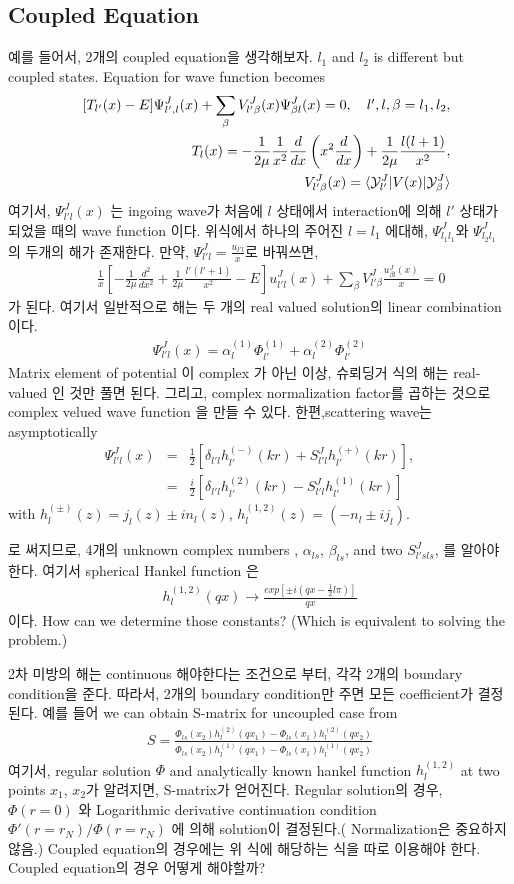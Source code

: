 \documentclass[10pt]{article}
\newcommand{\bea}{\begin{eqnarray}}
\newcommand{\eea}{\end{eqnarray}}
\newcommand{\no}{\nonumber \\}
\def\la{\langle}
\def\ra{\rangle}
\begin{document}
\subsection{Coupled Equation}
예를 들어서, 2개의 coupled equation을 생각해보자.
$l_1$ and $l_2$ is different but coupled states.
Equation for wave function becomes
\bea
& &[T_{l'}(x)-E]\Psi^J_{l', l}(x)
+\sum_{\beta} V^J_{l'\beta}(x)\Psi^J_{\beta  l}(x)=0,
\quad\mbox{$l',l,\beta=l_1,l_2$},
\no
& &T_{l}(x)=-\frac{1}{2\mu}\frac{1}{x^2}\frac{d}{dx}
  \left(x^2\frac{d}{dx}\right)+\frac{1}{2\mu}\frac{l(l+1)}{x^2},\no
& & V^J_{l'\beta}(x)=\la {\cal Y}^J_{l'}|V(x)|{\cal Y}^J_{\beta}\ra
\eea
여기서, $\Psi^J_{l' l}(x)$ 는 ingoing wave가 처음에 $l$ 
상태에서 interaction에 의해 $l'$ 상태가 되었을 때의 wave function 이다.
위식에서 하나의 주어진 $l=l_1$ 에대해, $\Psi^J_{l_1 l_1}$와
$\Psi^J_{l_2 l_1}$ 의 두개의 해가 존재한다.
만약, $\Psi^J_{l'l}=\frac{u_{l'l}}{x}$로
바꿔쓰면,
\bea
& & \frac{1}{x}\left[-\frac{1}{2\mu}\frac{d^2}{dx^2} 
                +\frac{1}{2\mu}\frac{l'(l'+1)}{x^2} 
                -E\right] u^J_{l'l}(x)
    +\sum_{\beta}V^J_{l'\beta}\frac{u^J_{\beta l}(x)}{x}=0                              
\eea
가 된다. 여기서 일반적으로 해는 두 개의 real valued solution의 linear 
combination이다.
\bea
\Psi^J_{l'l}(x)=\alpha_{l}^{(1)}\Phi^{(1)}_{l'}
               +\alpha_{l}^{(2)}\Phi^{(2)}_{l'}  
\eea
Matrix element of potential 이 complex 가 아닌 이상,
슈뢰딩거 식의 해는 real-valued 인 것만 풀면 된다. 그리고,
complex normalization factor를 곱하는 것으로 complex velued
wave function 을 만들 수 있다. 
한편,scattering wave는  asymptotically 
\bea
\Psi^J_{l'l}(x)&=&\frac{1}{2}[\delta_{l' l} h_{l'}^{(-)}(kr)
                           +S^J_{l' l}h_{l'}^{(+)}(kr)],\no
               &=&\frac{i}{2}[\delta_{l' l} h_{l'}^{(2)}(kr)
                           -S^J_{l' l}h_{l'}^{(1)}(kr)]              
\eea
with $h^{(\pm)}_{l}(z)=j_l(z)\pm i n_{l}(z)$,
$h^{(1,2)}_{l}(z)=(-n_l\pm i j_l)$. 

로 써지므로, 4개의 unknown complex numbers , 
$\alpha_{ls}$, $\beta_{ls}$, and two $S^J_{l' s ls}$,
를 알아야한다. 여기서 spherical Hankel function 은
\bea
h^{(1,2)}_{l}(qx)\to \frac{exp[\pm i(qx-\frac{1}{2}l\pi)]}{qx}
\eea 
이다. How can we determine those constants? (Which is equivalent to solving the problem.)

2차 미방의 해는 continuous 해야한다는 조건으로 부터, 각각 2개의 boundary condition을 준다.
따라서, 2개의 boundary condition만 주면 모든 coefficient가 결정된다. 
예를 들어 
we can obtain S-matrix for uncoupled case from
\bea
S=\frac{\Phi_{ls}(x_2)h_l^{(2)}(qx_1)-\Phi_{ls}(x_1)h_l^{(2)}(qx_2)}
     {\Phi_{ls}(x_2)h_l^{(1)}(qx_1)-\Phi_{ls}(x_1)h_l^{(1)}(qx_2)}
\eea
여기서, regular solution $\Phi$ and analytically known hankel function $h_l^{(1,2)}$
at two points $x_1$, $x_2$가 알려지면, S-matrix가 얻어진다. Regular solution의 경우,
$\Phi(r=0)$ 와 Logarithmic derivative continuation condition
$\Phi'(r=r_N)/\Phi(r=r_N)$ 에 의해 solution이 결정된다.( Normalization은 중요하지 않음.)  
Coupled equation의 경우에는 위 식에 해당하는 식을 따로 이용해야 한다.
Coupled equation의 경우 어떻게 해야할까?
\end{document}
